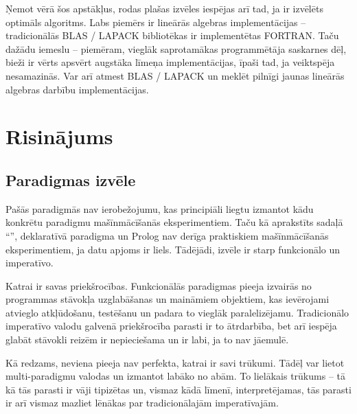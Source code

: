\documentclass{ludis}
\begin{document}
Ņemot vērā šos apstākļus, rodas plašas izvēles iespējas arī tad, ja ir izvēlēts optimāls algoritms. Labs piemērs ir lineārās algebras implementācijas -- tradicionālās BLAS / LAPACK bibliotēkas ir implementētas FORTRAN. Taču dažādu iemeslu -- piemēram, vieglāk saprotamākas programmētāja saskarnes dēļ, bieži ir vērts apsvērt augstāka līmeņa implementācijas, īpaši tad, ja veiktspēja nesamazinās. Var arī atmest BLAS / LAPACK un meklēt pilnīgi jaunas lineārās algebras darbību implementācijas.

\chapter{Risinājums}
\section{Paradigmas izvēle} \label{sec:paradigm_choice}
Pašās paradigmās nav ierobežojumu, kas principiāli liegtu izmantot kādu konkrētu paradigmu mašīnmācīšanās eksperimentiem. Taču kā aprakstīts sadaļā ``'', deklaratīvā paradigma un Prolog nav derīga praktiskiem mašīnmācīšanās eksperimentiem, ja datu apjoms ir liels. Tādējādi, izvēle ir starp funkcionālo un imperatīvo.

Katrai ir savas priekšrocības. Funkcionālās paradigmas pieeja izvairās no programmas stāvokļa uzglabāšanas un maināmiem objektiem, kas ievērojami atvieglo atkļūdošanu, testēšanu un padara to vieglāk paralelizējamu. Tradicionālo imperatīvo valodu galvenā priekšrocība parasti ir to ātrdarbība, bet arī iespēja glabāt stāvokli reizēm ir nepieciešama un ir labi, ja to nav jāemulē.

Kā redzams, neviena pieeja nav perfekta, katrai ir savi trūkumi. Tādēļ var lietot multi-paradigmu valodas un izmantot labāko no abām. To lielākais trūkums -- tā kā tās parasti ir vāji tipizētas un, vismaz kādā līmenī, interpretējamas, tās parasti ir arī vismaz mazliet lēnākas par tradicionālajām imperatīvajām. 
\end{document}
